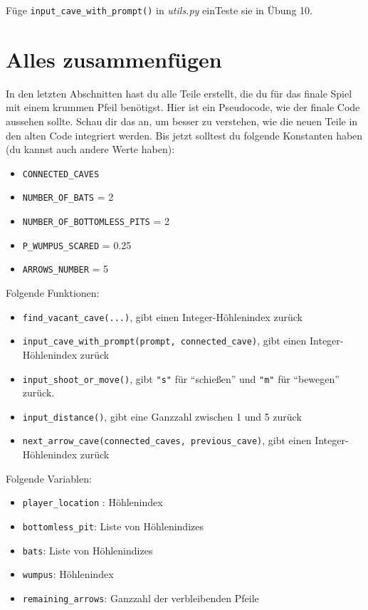 \documentclass[
]{book}
\providecommand{\tightlist}{%
  \setlength{\itemsep}{0pt}\setlength{\parskip}{0pt}}
\begin{document}
Füge \texttt{input\_cave\_with\_prompt()} in \emph{utils.py} einTeste sie in Übung 10.

\hypertarget{alles-zusammenfuxfcgen}{%
\section{Alles zusammenfügen}\label{alles-zusammenfuxfcgen}}

In den letzten Abschnitten hast du alle Teile erstellt, die du für das finale Spiel mit einem krummen Pfeil benötigst. Hier ist ein Pseudocode, wie der finale Code aussehen sollte. Schau dir das an, um besser zu verstehen, wie die neuen Teile in den alten Code integriert werden. Bis jetzt solltest du folgende Konstanten haben (du kannst auch andere Werte haben):

\begin{itemize}
\tightlist
\item
  \texttt{CONNECTED\_CAVES}
\item
  \texttt{NUMBER\_OF\_BATS} = 2
\item
  \texttt{NUMBER\_OF\_BOTTOMLESS\_PITS} = 2
\item
  \texttt{P\_WUMPUS\_SCARED} = 0.25
\item
  \texttt{ARROWS\_NUMBER} = 5
\end{itemize}

Folgende Funktionen:

\begin{itemize}
\tightlist
\item
  \texttt{find\_vacant\_cave(...)}, gibt einen Integer-Höhlenindex zurück
\item
  \texttt{input\_cave\_with\_prompt(prompt,\ connected\_cave)}, gibt einen Integer-Höhlenindex zurück
\item
  \texttt{input\_shoot\_or\_move()}, gibt \texttt{"s"} für ``schießen'' und \texttt{"m"} für ``bewegen'' zurück.
\item
  \texttt{input\_distance()}, gibt eine Ganzzahl zwischen 1 und 5 zurück
\item
  \texttt{next\_arrow\_cave(connected\_caves,\ previous\_cave)}, gibt einen Integer-Höhlenindex zurück
\end{itemize}

Folgende Variablen:

\begin{itemize}
\tightlist
\item
  \texttt{player\_location} : Höhlenindex
\item
  \texttt{bottomless\_pit}: Liste von Höhlenindizes
\item
  \texttt{bats}: Liste von Höhlenindizes
\item
  \texttt{wumpus}: Höhlenindex
\item
  \texttt{remaining\_arrows}: Ganzzahl der verbleibenden Pfeile
\end{itemize}
\end{document}
